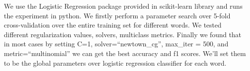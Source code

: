 We use the Logistic Regression package provided in scikit-learn library and runs the experiment in python. We firstly perform a parameter search over 5-fold cross-validation over the entire training set for different words. We tested different regularization values, solvers, multiclass metrics. Finally we found that in most cases by setting C=1, solver=``newtown\_cg'', max\_iter = 500, and metric=``multinomial'' we can get the best accuracy and f1 scores. We'll set them to be the global parameters over logistic regression classifier for each word. 